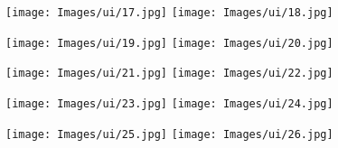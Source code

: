 \hspace{2cm}
\texttt{[image: Images/ui/17.jpg]}
\hspace{3cm}
\texttt{[image: Images/ui/18.jpg]}
\hfill

\vspace{3cm}

\hspace{2cm}
\texttt{[image: Images/ui/19.jpg]}
\hspace{3cm}
\texttt{[image: Images/ui/20.jpg]}
\hfill

\hspace{2cm}
\texttt{[image: Images/ui/21.jpg]}
\hspace{3cm}
\texttt{[image: Images/ui/22.jpg]}
\hfill

\vspace{3cm}

\hspace{2cm}
\texttt{[image: Images/ui/23.jpg]}
\hspace{3cm}
\texttt{[image: Images/ui/24.jpg]}
\hfill

\hspace{2cm}
\texttt{[image: Images/ui/25.jpg]}
\hspace{3cm}
\texttt{[image: Images/ui/26.jpg]}
\hfill